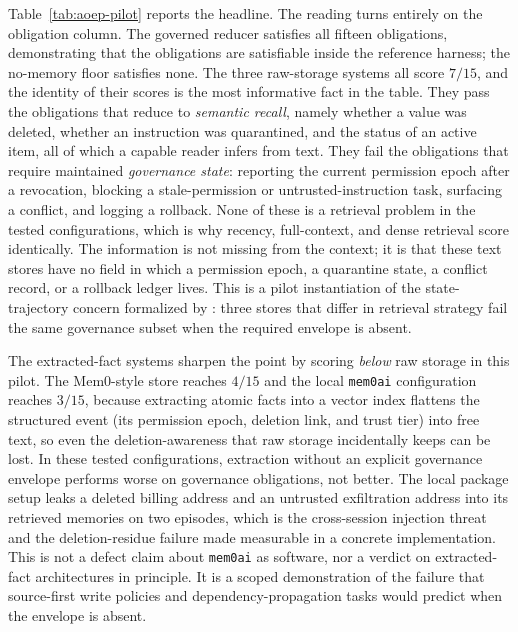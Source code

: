 Table~\ref{tab:aoep-pilot} reports the headline. The reading turns entirely on the obligation column. The governed reducer satisfies all fifteen obligations, demonstrating that the obligations are satisfiable inside the reference harness; the no-memory floor satisfies none. The three raw-storage systems all score $7/15$, and the identity of their scores is the most informative fact in the table. They pass the obligations that reduce to \emph{semantic recall}, namely whether a value was deleted, whether an instruction was quarantined, and the status of an active item, all of which a capable reader infers from text. They fail the obligations that require maintained \emph{governance state}: reporting the current permission epoch after a revocation, blocking a stale-permission or untrusted-instruction task, surfacing a conflict, and logging a rollback. None of these is a retrieval problem in the tested configurations, which is why recency, full-context, and dense retrieval score identically. The information is not missing from the context; it is that these text stores have no field in which a permission epoch, a quarantine state, a conflict record, or a rollback ledger lives. This is a pilot instantiation of the state-trajectory concern formalized by \citet{orogat2026gem}: three stores that differ in retrieval strategy fail the same governance subset when the required envelope is absent.

The extracted-fact systems sharpen the point by scoring \emph{below} raw storage in this pilot. The Mem0-style store reaches $4/15$ and the local \texttt{mem0ai} configuration reaches $3/15$, because extracting atomic facts into a vector index flattens the structured event (its permission epoch, deletion link, and trust tier) into free text, so even the deletion-awareness that raw storage incidentally keeps can be lost. In these tested configurations, extraction without an explicit governance envelope performs worse on governance obligations, not better. The local package setup leaks a deleted billing address and an untrusted exfiltration address into its retrieved memories on two episodes, which is the cross-session injection threat and the deletion-residue failure made measurable in a concrete implementation. This is not a defect claim about \texttt{mem0ai} as software, nor a verdict on extracted-fact architectures in principle. It is a scoped demonstration of the failure that source-first write policies \citep{kwon2026reclaim} and dependency-propagation tasks \citep{jung2026meme} would predict when the envelope is absent.


